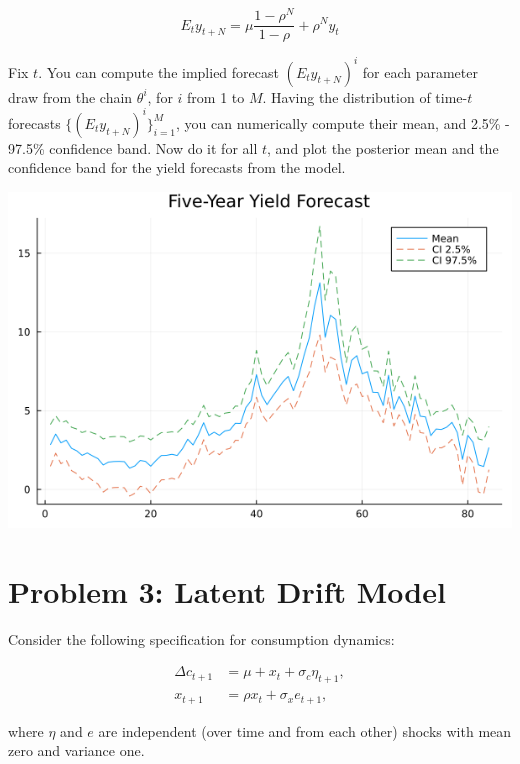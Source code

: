 \documentclass{article}
\begin{document}
\begin{enumerate}
$$
E_ty_{t+N} = \mu \frac{1 - \rho^N}{1 - \rho} + \rho^N y_t
$$

Fix $t$. You can compute the implied forecast $(E_t y_{t+N})^i$ for each parameter draw from the chain $\theta^i$, for $i$ from 1 to $M$. Having the distribution of time-$t$ forecasts $\{(E_t y_{t+N})^i\}_{i=1}^M$, you
can numerically compute their mean, and 2.5\% - 97.5\% confidence band. Now do it for all $t$, and plot the posterior mean and the confidence band for the yield forecasts from the model.

\begin{center}
\includegraphics[scale =0.5]{p2_q6_forecast}
\end{center}

\end{enumerate}

\pagebreak

\section{Problem 3: Latent Drift Model}

Consider the following specification for consumption dynamics:

\begin{align*}
\Delta c_{t+1} &= \mu + x_t + \sigma_c \eta_{t+1},\\
x_{t+1} &= \rho x_t + \sigma_x e_{t+1},
\end{align*}

where $\eta$ and $e$ are independent (over time and from each other) shocks with mean zero and variance one.
\end{document}
